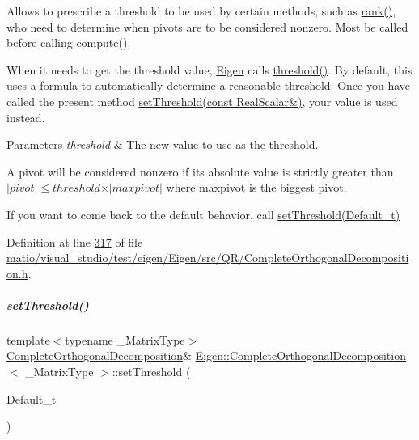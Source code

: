 Allows to prescribe a threshold to be used by certain methods, such as \hyperlink{group___q_r___module_af348f64b26f8467a020062c22b748806}{rank()}, who need to determine when pivots are to be considered nonzero. Most be called before calling compute().

When it needs to get the threshold value, \hyperlink{namespace_eigen}{Eigen} calls \hyperlink{group___q_r___module_a3909f07268496c0f08f1b57331d91075}{threshold()}. By default, this uses a formula to automatically determine a reasonable threshold. Once you have called the present method \hyperlink{group___q_r___module_aa9c9f7cbde9d58ca5552381b70ad8d82}{set\+Threshold(const Real\+Scalar\&)}, your value is used instead.


\begin{DoxyParams}{Parameters}
{\em threshold} & The new value to use as the threshold.\\
\hline
\end{DoxyParams}
A pivot will be considered nonzero if its absolute value is strictly greater than $ \vert pivot \vert \leqslant threshold \times \vert maxpivot \vert $ where maxpivot is the biggest pivot.

If you want to come back to the default behavior, call \hyperlink{group___q_r___module_a27c8da71874be7a64d6723bd0cae9f4f}{set\+Threshold(\+Default\+\_\+t)} 

Definition at line \hyperlink{matio_2visual__studio_2test_2eigen_2_eigen_2src_2_q_r_2_complete_orthogonal_decomposition_8h_source_l00317}{317} of file \hyperlink{matio_2visual__studio_2test_2eigen_2_eigen_2src_2_q_r_2_complete_orthogonal_decomposition_8h_source}{matio/visual\+\_\+studio/test/eigen/\+Eigen/src/\+Q\+R/\+Complete\+Orthogonal\+Decomposition.\+h}.

\mbox{\label{group___q_r___module_a27c8da71874be7a64d6723bd0cae9f4f}} 
\subparagraph{\texorpdfstring{set\+Threshold()}{setThreshold()}\hspace{0.1cm}{\footnotesize\ttfamily [3/4]}}
{\footnotesize\ttfamily template$<$typename \+\_\+\+Matrix\+Type$>$ \\
\hyperlink{group___q_r___module_class_eigen_1_1_complete_orthogonal_decomposition}{Complete\+Orthogonal\+Decomposition}\& \hyperlink{group___q_r___module_class_eigen_1_1_complete_orthogonal_decomposition}{Eigen\+::\+Complete\+Orthogonal\+Decomposition}$<$ \+\_\+\+Matrix\+Type $>$\+::set\+Threshold (\begin{DoxyParamCaption}\item[{Default\+\_\+t}]{ }\end{DoxyParamCaption})\hspace{0.3cm}{\ttfamily [inline]}}

